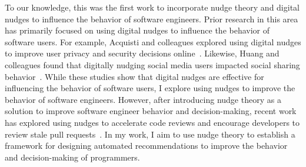 To our knowledge, this was the first work to incorporate nudge theory and digital nudges to influence the behavior of software engineers. Prior research in this area has primarily focused on using digital nudges to influence the behavior of software users. For example, Acquisti and colleagues explored using digital nudges to improve user privacy and security decisions online~\cite{acquisti2017nudges}. Likewise, Huang and colleagues found that digitally nudging social media users impacted social sharing behavior~\cite{huang2018digital}. While these studies show that digital nudges are effective for influencing the behavior of software users, I explore using nudges to improve the behavior of software engineers. However, after introducing nudge theory as a solution to improve software engineer behavior and decision-making, recent work has explored using nudges to accelerate code reviews and encourage developers to review stale pull requests~\cite{maddila2020nudge}. In my work, I aim to use nudge theory to establish a framework for designing automated recommendations to improve the behavior and decision-making of programmers.
